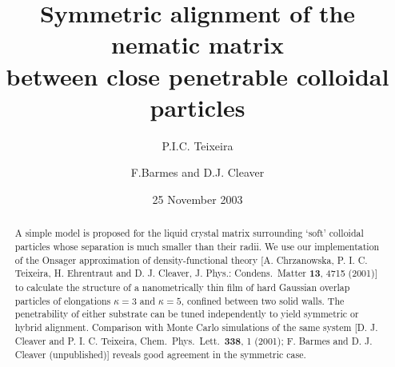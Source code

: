 \documentclass[aps,pre,twocolumn,groupedaddress,showpacs]{revtex4}
\begin{document}
\graphicspath
{
{../imgs/}
}


\title{Symmetric alignment of the nematic matrix \\
between close penetrable colloidal particles}


\author{P.I.C. Teixeira}


\author{F.Barmes and D.J. Cleaver}



\date{25 November 2003}



\begin{abstract}
A simple model is proposed for the liquid crystal matrix surrounding 
`soft' colloidal particles whose separation is much smaller than their 
radii. We use our implementation of the Onsager approximation of 
density-functional theory [A. Chrzanowska, P. I. C. Teixeira, 
H. Ehrentraut and D. J. Cleaver, J. Phys.: Condens.\ Matter {\bf 13}, 
4715 (2001)] to calculate the structure of a nanometrically thin film
of hard Gaussian overlap particles of elongations $\kappa=3$  and
$\kappa=5$, confined between two solid walls. The penetrability of 
either substrate can be tuned independently to yield symmetric or 
hybrid alignment. Comparison with Monte Carlo simulations of the same 
system [D. J. Cleaver and P. I. C. Teixeira, Chem.\ Phys.\ Lett.\ 
{\bf 338}, 1 (2001); F. Barmes and D. J. Cleaver (unpublished)] reveals 
good agreement in the symmetric case.

\vspace{1cm}
\end{abstract}

\maketitle
\end{document}
